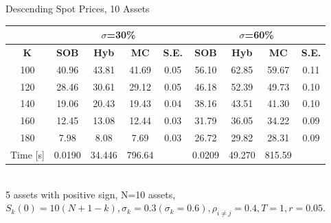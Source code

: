\documentclass[a4paper]{article}
\begin{document}
\begin {table}
\caption {Descending Spot Prices, 10 Assets} 
\begin{center}
\begin{tabular}{c|c c c c|c c c c}
\hline
\multicolumn{1}{c|}{} & \multicolumn{4}{|c|}{$\sigma$=30\%} & \multicolumn{4}{|c}{$\sigma$=60\%} \\ 
\hline
  \textbf{K} & \textbf{SOB} & \textbf{Hyb}	& \textbf{MC}& \textbf{S.E.} & \textbf{SOB} & \textbf{Hyb} & \textbf{MC} & \textbf{S.E.} \\
100 &40.96&43.81&41.69& 0.05& 56.10& 62.85&59.67 & 0.11\\
120 &28.46&30.61& 29.12& 0.05&46.18& 52.39&49.73&0.10\\
140 &19.06&20.43& 19.43& 0.04& 38.16&43.51&41.30&0.10\\
160 &12.45&13.08& 12.44& 0.03 & 31.79&36.05& 34.22& 0.09 \\
180 &7.98& 8.08&7.69 & 0.03& 26.72&29.82&28.31&0.09\\
\hline
Time [s]& 0.0190&34.446& 796.64 & & 0.0209& 49.270&815.59 & \\
\hline
\end{tabular}
\\[8pt]
\caption*{5 assets with positive sign, N=10 assets, $S_k(0)=10(N+1-k), \sigma_k = 0.3 (\sigma_k = 0.6), \rho_{i\neq j} = 0.4, T = 1, r=0.05.$}
\end{center}
\end{table}
\end{document}
